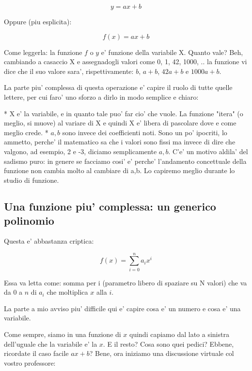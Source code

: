 \begin{equation}
  y = a x + b 
\end{equation}

Oppure (piu esplicita): 

\begin{equation}
  f(x) = a x + b 
\end{equation}

Come leggerla: la funzione $f$ o $y$ e' funzione della variabile X. Quanto vale? Beh, cambiando a casaccio X e assegnadogli valori
come 0, 1, 42, 1000, .. la funzione vi dice che il suo valore sara', rispettivamente: $b$, $a+b$, $42a+b$ e $1000a+b$.

La parte piu' complessa di questa operazione e' capire il ruolo di tutte quelle lettere, per cui faro' uno sforzo a dirlo in modo semplice e chiaro:

* X e' la variabile, e in quanto tale puo' far cio' che vuole. La funzione "itera" 
  (o meglio, si muove) al variare di X e quindi X e' libera di pascolare dove e come meglio crede.
* $a,b$ sono invece dei coefficienti noti. Sono un po' ipocriti, lo ammetto, perche' il matematico sa che i valori sono fissi
  ma invece di dire che valgono, ad esempio, 2 e -3, diciamo semplicamente $a,b$. C'e' un motivo aldila' del sadismo puro:
  in genere se facciamo cosi' e' perche' l'andamento concettuale della funzione non cambia molto al cambiare di a,b. Lo capiremo
  meglio durante lo studio di funzione.

\subsection{Una funzione piu' complessa: un generico polinomio}

Questa e' abbastanza criptica:

\begin{equation}
  f(x)= \sum_{i=0}^n a_ix^i 
\end{equation}


Essa va letta come: somma per i (parametro libero di spaziare su N valori) che va da $0$ a $n$ di $a_i$ che moltiplica $x$ alla $i$.

La parte a mio avviso piu' difficile qui e' capire cosa e' un numero e cosa e' una variabile.

Come sempre, siamo in una funzione di $x$ quindi capiamo dal lato a sinistra dell'uguale che la variabile e' la $x$.
E il resto? Cosa sono quei pedici? 
Ebbene, ricordate il caso facile $ a x + b $? Bene, ora iniziamo una discussione virtuale col vostro professore:


